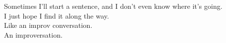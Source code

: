 
%


        
\begin{ntquote}
Sometimes I'll start a sentence, and I don't even know where it's going.\\I just hope I find it along the way.\\Like an improv conversation.\\An improversation.%
\end{ntquote}

